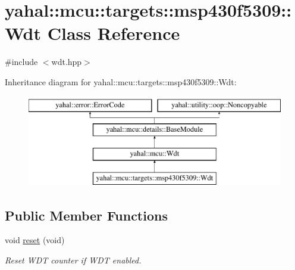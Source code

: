 \hypertarget{classyahal_1_1mcu_1_1targets_1_1msp430f5309_1_1_wdt}{}\section{yahal\+:\+:mcu\+:\+:targets\+:\+:msp430f5309\+:\+:Wdt Class Reference}
\label{classyahal_1_1mcu_1_1targets_1_1msp430f5309_1_1_wdt}


\begin{DoxyVerb}\end{DoxyVerb}
  




{\ttfamily \#include $<$wdt.\+hpp$>$}

Inheritance diagram for yahal\+:\+:mcu\+:\+:targets\+:\+:msp430f5309\+:\+:Wdt\+:\begin{figure}[H]
\begin{center}
\leavevmode
\includegraphics[height=4.000000cm]{classyahal_1_1mcu_1_1targets_1_1msp430f5309_1_1_wdt}
\end{center}
\end{figure}
\subsection*{Public Member Functions}
\begin{DoxyCompactItemize}
\item 
\hypertarget{classyahal_1_1mcu_1_1targets_1_1msp430f5309_1_1_wdt_a80cb956c417c5a477bfe07ccf7bb4356}{}void \hyperlink{classyahal_1_1mcu_1_1targets_1_1msp430f5309_1_1_wdt_a80cb956c417c5a477bfe07ccf7bb4356}{reset} (void)\label{classyahal_1_1mcu_1_1targets_1_1msp430f5309_1_1_wdt_a80cb956c417c5a477bfe07ccf7bb4356}

\begin{DoxyCompactList}\small\item\em Reset W\+D\+T counter if W\+D\+T enabled. \end{DoxyCompactList}\end{DoxyCompactItemize}
